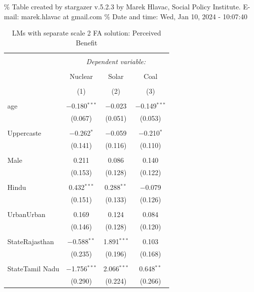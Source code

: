 \documentclass[
]{article}
\begin{document}
\begingroup\setlength{\tabcolsep}{1pt}

\renewcommand{\arraystretch}{0.7}

\% Table created by stargazer v.5.2.3 by Marek Hlavac, Social Policy
Institute. E-mail: marek.hlavac at gmail.com \% Date and time: Wed, Jan
10, 2024 - 10:07:40

\begin{table}[!htbp] \centering 
  \caption{LMs with separate scale 2 FA solution: Perceived Benefit} 
  \label{} 
\begin{tabular}{@{\extracolsep{5pt}}lccc} 
\\[-1.8ex]\hline 
\hline \\[-1.8ex] 
 & \multicolumn{3}{c}{\textit{Dependent variable:}} \\ 
\cline{2-4} 
\\[-1.8ex] & Nuclear & Solar & Coal \\ 
\\[-1.8ex] & (1) & (2) & (3)\\ 
\hline \\[-1.8ex] 
 age & $-$0.180$^{***}$ & $-$0.023 & $-$0.149$^{***}$ \\ 
  & (0.067) & (0.051) & (0.053) \\ 
  & & & \\ 
 Uppercaste & $-$0.262$^{*}$ & $-$0.059 & $-$0.210$^{*}$ \\ 
  & (0.141) & (0.116) & (0.110) \\ 
  & & & \\ 
 Male & 0.211 & 0.086 & 0.140 \\ 
  & (0.153) & (0.128) & (0.122) \\ 
  & & & \\ 
 Hindu & 0.432$^{***}$ & 0.288$^{**}$ & $-$0.079 \\ 
  & (0.151) & (0.133) & (0.126) \\ 
  & & & \\ 
 UrbanUrban & 0.169 & 0.124 & 0.084 \\ 
  & (0.146) & (0.128) & (0.120) \\ 
  & & & \\ 
 StateRajasthan & $-$0.588$^{**}$ & 1.891$^{***}$ & 0.103 \\ 
  & (0.235) & (0.196) & (0.168) \\ 
  & & & \\ 
 StateTamil Nadu & $-$1.756$^{***}$ & 2.066$^{***}$ & 0.648$^{**}$ \\ 
  & (0.290) & (0.224) & (0.266) \\ 

\end{tabular}
\end{table}
\end{document}

